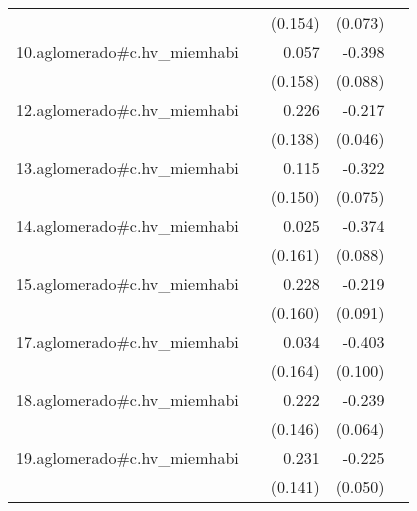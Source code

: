 {\begin{longtable}{l*{4}{D{.}{.}{-1}}}
            &                     &     (0.154)         &     (0.073)         &                     \\
\addlinespace
10.aglomerado#c.hv\_miemhabi&                     &       0.057         &      -0.398\sym{***}&                     \\
            &                     &     (0.158)         &     (0.088)         &                     \\
\addlinespace
12.aglomerado#c.hv\_miemhabi&                     &       0.226         &      -0.217\sym{***}&                     \\
            &                     &     (0.138)         &     (0.046)         &                     \\
\addlinespace
13.aglomerado#c.hv\_miemhabi&                     &       0.115         &      -0.322\sym{***}&                     \\
            &                     &     (0.150)         &     (0.075)         &                     \\
\addlinespace
14.aglomerado#c.hv\_miemhabi&                     &       0.025         &      -0.374\sym{***}&                     \\
            &                     &     (0.161)         &     (0.088)         &                     \\
\addlinespace
15.aglomerado#c.hv\_miemhabi&                     &       0.228         &      -0.219\sym{*}  &                     \\
            &                     &     (0.160)         &     (0.091)         &                     \\
\addlinespace
17.aglomerado#c.hv\_miemhabi&                     &       0.034         &      -0.403\sym{***}&                     \\
            &                     &     (0.164)         &     (0.100)         &                     \\
\addlinespace
18.aglomerado#c.hv\_miemhabi&                     &       0.222         &      -0.239\sym{***}&                     \\
            &                     &     (0.146)         &     (0.064)         &                     \\
\addlinespace
19.aglomerado#c.hv\_miemhabi&                     &       0.231         &      -0.225\sym{***}&                     \\
            &                     &     (0.141)         &     (0.050)         &                     \\

\end{longtable}}
